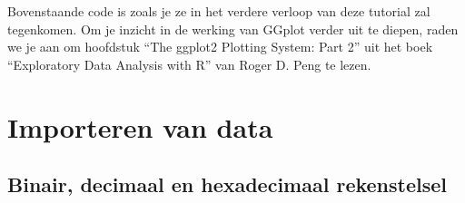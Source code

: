 \documentclass[]{memoir}
\begin{document}
Bovenstaande code is zoals je ze in het verdere verloop van deze tutorial zal tegenkomen. Om je inzicht in de werking van GGplot verder uit te diepen, raden we je aan om hoofdstuk ``The ggplot2 Plotting System: Part 2'' uit het boek ``Exploratory Data Analysis with R'' van Roger D. Peng te lezen.

\hypertarget{importeren-van-data}{%
\chapter{Importeren van data}\label{importeren-van-data}}

\hypertarget{binair-decimaal-en-hexadecimaal-rekenstelsel-1}{%
\section{Binair, decimaal en hexadecimaal rekenstelsel}\label{binair-decimaal-en-hexadecimaal-rekenstelsel-1}}
\end{document}

